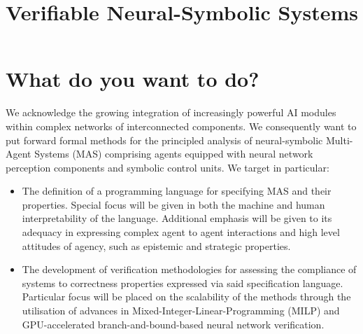 \documentclass[11pt]{article}
\title{Verifiable Neural-Symbolic Systems}
\date{}
\begin{document}
\maketitle
\section{What do you want to do?}



We acknowledge the growing integration of increasingly
powerful AI modules within complex networks of
interconnected components. We consequently want to put
forward formal methods for the principled analysis of
neural-symbolic Multi-Agent Systems (MAS) comprising agents
equipped with neural network perception components and
symbolic control units. We target in particular:
\begin{itemize}
    \item  The definition of a programming language for
        specifying MAS and  their
        properties. Special focus will be given in both the
        machine and human interpretability of the language.
        Additional emphasis will be given to 
        its adequacy in expressing complex agent to
        agent interactions and high level attitudes of
        agency, such as epistemic and strategic properties.
    \item The development of  verification
        methodologies for assessing the compliance of
        systems  to correctness properties expressed via
        said specification language. Particular focus will
        be placed on the scalability of the methods through
        the utilisation of advances in
        Mixed-Integer-Linear-Programming (MILP) and
        GPU-accelerated branch-and-bound-based neural
        network verification.
\end{itemize}

\end{document}
